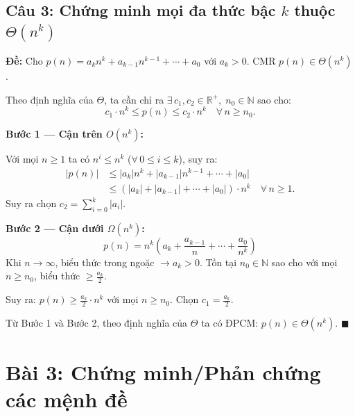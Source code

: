 \documentclass[12pt,a4paper]{article}
\begin{document}
\subsection{Câu 3: Chứng minh mọi đa thức bậc $k$ thuộc $\Theta(n^k)$}

\textbf{Đề:} Cho $p(n) = a_k n^k + a_{k-1}n^{k-1} + \cdots + a_0$ với $a_k > 0$. CMR $p(n) \in \Theta(n^k)$.

Theo định nghĩa của $\Theta$, ta cần chỉ ra $\exists\, c_1, c_2 \in \mathbb{R}^+,\; n_0 \in \mathbb{N}$ sao cho:
\[
  c_1 \cdot n^k \leq p(n) \leq c_2 \cdot n^k \quad \forall\, n \geq n_0.
\]

\textbf{Bước 1 --- Cận trên $O(n^k)$:}

Với mọi $n \geq 1$ ta có $n^i \leq n^k$ ($\forall\, 0 \leq i \leq k$), suy ra:
\begin{align*}
  |p(n)| &\leq |a_k|n^k + |a_{k-1}|n^{k-1} + \cdots + |a_0| \\
         &\leq (|a_k| + |a_{k-1}| + \cdots + |a_0|) \cdot n^k \quad \forall\, n \geq 1.
\end{align*}
Suy ra chọn $c_2 = \sum_{i=0}^{k} |a_i|$.

\textbf{Bước 2 --- Cận dưới $\Omega(n^k)$:}
\[
  p(n) = n^k \left(a_k + \frac{a_{k-1}}{n} + \cdots + \frac{a_0}{n^k}\right)
\]
Khi $n \to \infty$, biểu thức trong ngoặc $\to a_k > 0$. Tồn tại $n_0 \in \mathbb{N}$ sao cho với mọi $n \geq n_0$, biểu thức $\geq \frac{a_k}{2}$.

Suy ra: $p(n) \geq \frac{a_k}{2} \cdot n^k$ với mọi $n \geq n_0$. Chọn $c_1 = \frac{a_k}{2}$.

Từ Bước 1 và Bước 2, theo định nghĩa của $\Theta$ ta có ĐPCM:
$p(n) \in \Theta(n^k)$. \hfill $\blacksquare$

\newpage
\section{Bài 3: Chứng minh/Phản chứng các mệnh đề}
\end{document}
